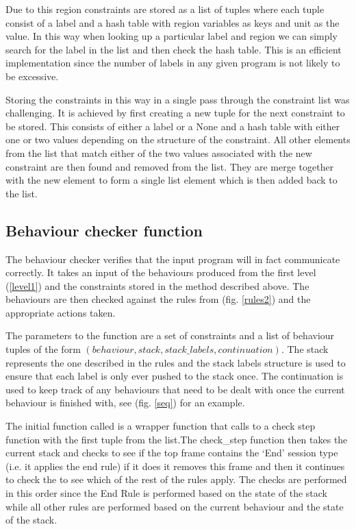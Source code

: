 Due to this region constraints are stored as a list of tuples where each tuple consist of a label and a hash table with region variables as keys and unit as the value. In this way when looking up a particular label and region we can simply search for the label in the list and then check the hash table. This is an efficient implementation since the number of labels in any given program is not likely to be excessive. 

Storing the constraints in this way in a single pass through the constraint list was challenging. It is achieved by first creating a new tuple for the next constraint to be stored. This consists of either a label or a None and a hash table with either one or two values depending on the structure of the constraint. All other elements from the list that match either of the two values associated with the new constraint are then found and removed from the list. They are merge together with the new element to form a single list element which is then added back to the list. 

\subsection{Behaviour checker function}

The behaviour checker verifies that the input program will in fact communicate correctly. It takes an input of the behaviours produced from the first level (\ref{level1}) and the constraints stored in the method described above. The behaviours are then checked against the rules from (fig. \ref{rules2}) and the appropriate actions taken. 

The parameters to the function are a set of constraints and a list of behaviour tuples of the form $(behaviour, stack, stack\_labels, continuation)$. The stack represents the one described in the rules and the stack labels structure is used to ensure that each label is only ever pushed to the stack once. The continuation is used to keep track of any behaviours that need to be dealt with once the current behaviour is finished with, see (fig. \ref{seq}) for an example. 

The initial function called is a wrapper function that calls to a check step function with the first tuple from the list.The check_step function then takes the current stack and checks to see if the top frame contains the `End' session type (i.e. it applies the end rule) if it does it removes this frame and then it continues to check the to see which of the rest of the rules apply. The checks are performed in this order since the End Rule is performed based on the state of the stack while all other rules are performed based on the current behaviour and the state of the stack. 

